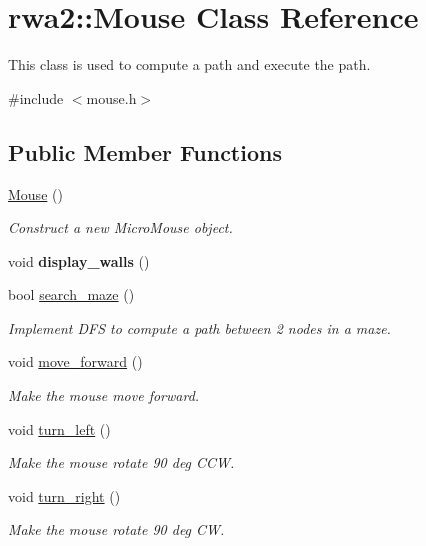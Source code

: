 \hypertarget{classrwa2_1_1_mouse}{}\section{rwa2\+:\+:Mouse Class Reference}
\label{classrwa2_1_1_mouse}


This class is used to compute a path and execute the path.  




{\ttfamily \#include $<$mouse.\+h$>$}

\subsection*{Public Member Functions}
\begin{DoxyCompactItemize}
\item 
\hyperlink{classrwa2_1_1_mouse_a048dffae3aaa3a6ddc2c6cc4741a097c}{Mouse} ()
\begin{DoxyCompactList}\small\item\em Construct a new Micro\+Mouse object. \end{DoxyCompactList}\item 
\mbox{\label{classrwa2_1_1_mouse_abbcc99c41fd073426fdfd790f947956e}} 
void {\bfseries display\+\_\+walls} ()
\item 
bool \hyperlink{classrwa2_1_1_mouse_a789be287a432bafc903c97396a014d7d}{search\+\_\+maze} ()
\begin{DoxyCompactList}\small\item\em Implement D\+FS to compute a path between 2 nodes in a maze. \end{DoxyCompactList}\item 
\mbox{\label{classrwa2_1_1_mouse_afc6e0d56e3a777c05efa3929eb256e0a}} 
void \hyperlink{classrwa2_1_1_mouse_afc6e0d56e3a777c05efa3929eb256e0a}{move\+\_\+forward} ()
\begin{DoxyCompactList}\small\item\em Make the mouse move forward. \end{DoxyCompactList}\item 
\mbox{\label{classrwa2_1_1_mouse_a5748e94e740432c334d15364fb476919}} 
void \hyperlink{classrwa2_1_1_mouse_a5748e94e740432c334d15364fb476919}{turn\+\_\+left} ()
\begin{DoxyCompactList}\small\item\em Make the mouse rotate 90 deg C\+CW. \end{DoxyCompactList}\item 
\mbox{\label{classrwa2_1_1_mouse_ac929127d86fc4a41d1e216968b1dae20}} 
void \hyperlink{classrwa2_1_1_mouse_ac929127d86fc4a41d1e216968b1dae20}{turn\+\_\+right} ()
\begin{DoxyCompactList}\small\item\em Make the mouse rotate 90 deg CW. \end{DoxyCompactList}\end{DoxyCompactItemize}


